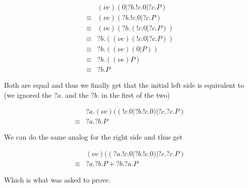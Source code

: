 \begin{align*}
&(\nu c)(0|?b.!c.0|?c.P)\\
\equiv &(\nu c)(?b.!c.0|?c.P)\\
\equiv &(\nu c)(?b.(!c.0|?c.P))\\
\equiv &?b.((\nu c)(!c.0|?c.P))\\
\equiv &?b.((\nu c)(0|P))\\
\equiv &?b.((\nu c) P)\\
\equiv &?b.P
\end{align*}

Both are equal and thus we finally get that the initial left side is equivalent to (we ignored the $?a.$ and the $?b.$ in the first of the two)

\begin{align*}
&?a.(\nu c)((!c.0|?b.!c.0)|?c.?c.P)\\
\equiv &?a.?b.P
\end{align*}

We can do the same analog for the right side and thus get

\begin{align*}
&(\nu c)((?a.!c.0|?b.!c.0)|?c.?c.P)\\
\equiv &?a.?b.P + ?b.?a.P
\end{align*}

Which is what was asked to prove.
